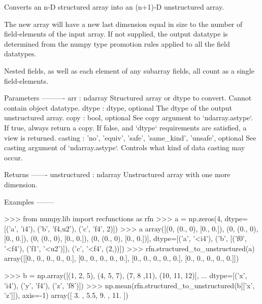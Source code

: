 \begin{DoxyVerb}Converts an n-D structured array into an (n+1)-D unstructured array.

The new array will have a new last dimension equal in size to the
number of field-elements of the input array. If not supplied, the output
datatype is determined from the numpy type promotion rules applied to all
the field datatypes.

Nested fields, as well as each element of any subarray fields, all count
as a single field-elements.

Parameters
----------
arr : ndarray
   Structured array or dtype to convert. Cannot contain object datatype.
dtype : dtype, optional
   The dtype of the output unstructured array.
copy : bool, optional
    See copy argument to `ndarray.astype`. If true, always return a copy.
    If false, and `dtype` requirements are satisfied, a view is returned.
casting : {'no', 'equiv', 'safe', 'same_kind', 'unsafe'}, optional
    See casting argument of `ndarray.astype`. Controls what kind of data
    casting may occur.

Returns
-------
unstructured : ndarray
   Unstructured array with one more dimension.

Examples
--------

>>> from numpy.lib import recfunctions as rfn
>>> a = np.zeros(4, dtype=[('a', 'i4'), ('b', 'f4,u2'), ('c', 'f4', 2)])
>>> a
array([(0, (0., 0), [0., 0.]), (0, (0., 0), [0., 0.]),
       (0, (0., 0), [0., 0.]), (0, (0., 0), [0., 0.])],
      dtype=[('a', '<i4'), ('b', [('f0', '<f4'), ('f1', '<u2')]), ('c', '<f4', (2,))])
>>> rfn.structured_to_unstructured(a)
array([[0., 0., 0., 0., 0.],
       [0., 0., 0., 0., 0.],
       [0., 0., 0., 0., 0.],
       [0., 0., 0., 0., 0.]])

>>> b = np.array([(1, 2, 5), (4, 5, 7), (7, 8 ,11), (10, 11, 12)],
...              dtype=[('x', 'i4'), ('y', 'f4'), ('z', 'f8')])
>>> np.mean(rfn.structured_to_unstructured(b[['x', 'z']]), axis=-1)
array([ 3. ,  5.5,  9. , 11. ])\end{DoxyVerb}
 \mbox{\label{namespacenumpy_1_1lib_1_1recfunctions_a7c256112f27f43cd7d6b581c9c2f1c46}} 
